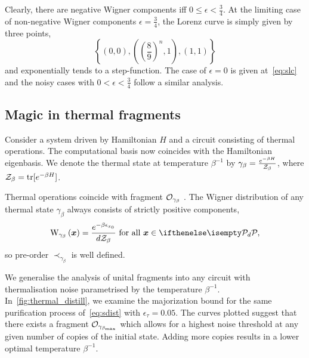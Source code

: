 \documentclass[pra,
aps,
twocolumn,
superscriptaddress,
groupedaddress,
nofootinbib,
reprint
]{revtex4-1}
\begin{document}
Clearly, there are negative Wigner components iff $0\leq \epsilon < \frac{3}{4}$.
At the limiting case of non-negative Wigner components $\epsilon = \frac{3}{4}$, the Lorenz curve is simply given by three points,
\begin{equation}
\left\{(0,0), \left(\left(\frac{8}{9}\right)^n, 1\right), (1,1) \right\}
\end{equation}
and exponentially tends to a step-function.
The case of $\epsilon = 0$ is given at~\cref{eq:slc} and the noisy cases with $0 < \epsilon < \frac{3}{4}$ follow a similar analysis.

\newpage

\subsection{Magic in thermal fragments}\label{sec:thermal}

Consider a system driven by Hamiltonian $H$ and a circuit consisting of thermal operations.
The computational basis now coincides with the Hamiltonian eigenbasis.
We denote the thermal state at temperature $\beta^{-1}$ by $\gamma_\beta = \frac{e^{-\beta H}}{\mathcal{Z}_\beta}$, where $\mathcal{Z}_\beta = {\rm{tr}}[e^{-\beta H}]$.

Thermal operations coincide with fragment $\mathcal{O}_{\gamma_\beta}$ .
The Wigner distribution of any thermal state $\gamma_\beta$ always consists of strictly positive components,
\begin{equation}
	\W[\bmx]{\gamma_\beta} = \frac{e^{-\beta \epsilon_{x_0}}}{d\Z_\beta}\ \text{for all}\ \bmx \in \pd,
\end{equation}
so pre-order $\prec_{\gamma_\beta}$ is well defined.

We generalise the analysis of unital fragments into any circuit with thermalisation noise parametrised by the temperature $\beta^{-1}$.
In~\cref{fig:thermal_distill}, we examine the majorization bound for the same purification process of~\cref{eq:sdist} with $\epsilon_\tau = 0.05$.
The curves plotted suggest that there exists a fragment $\mathcal{O}_{\gamma_{\beta_{\rm{max}}}}$ which allows for a highest noise threshold at any given number of copies of the initial state.
Adding more copies results in a lower optimal temperature $\beta^{-1}$.
\end{document}
